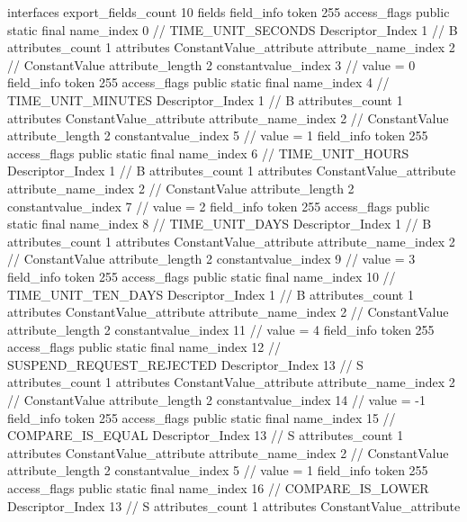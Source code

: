 {{{			interfaces {
			}
			export_fields_count	10
			fields {
			field_info {
				token	255
				access_flags	public static final
				name_index	0		// TIME_UNIT_SECONDS
				Descriptor_Index	1		// B
				attributes_count	1
				attributes {
				ConstantValue_attribute {
					attribute_name_index	2		// ConstantValue
					attribute_length	2
					constantvalue_index	3		// value = 0
				}
				}
			}
			field_info {
				token	255
				access_flags	public static final
				name_index	4		// TIME_UNIT_MINUTES
				Descriptor_Index	1		// B
				attributes_count	1
				attributes {
				ConstantValue_attribute {
					attribute_name_index	2		// ConstantValue
					attribute_length	2
					constantvalue_index	5		// value = 1
				}
				}
			}
			field_info {
				token	255
				access_flags	public static final
				name_index	6		// TIME_UNIT_HOURS
				Descriptor_Index	1		// B
				attributes_count	1
				attributes {
				ConstantValue_attribute {
					attribute_name_index	2		// ConstantValue
					attribute_length	2
					constantvalue_index	7		// value = 2
				}
				}
			}
			field_info {
				token	255
				access_flags	public static final
				name_index	8		// TIME_UNIT_DAYS
				Descriptor_Index	1		// B
				attributes_count	1
				attributes {
				ConstantValue_attribute {
					attribute_name_index	2		// ConstantValue
					attribute_length	2
					constantvalue_index	9		// value = 3
				}
				}
			}
			field_info {
				token	255
				access_flags	public static final
				name_index	10		// TIME_UNIT_TEN_DAYS
				Descriptor_Index	1		// B
				attributes_count	1
				attributes {
				ConstantValue_attribute {
					attribute_name_index	2		// ConstantValue
					attribute_length	2
					constantvalue_index	11		// value = 4
				}
				}
			}
			field_info {
				token	255
				access_flags	public static final
				name_index	12		// SUSPEND_REQUEST_REJECTED
				Descriptor_Index	13		// S
				attributes_count	1
				attributes {
				ConstantValue_attribute {
					attribute_name_index	2		// ConstantValue
					attribute_length	2
					constantvalue_index	14		// value = -1
				}
				}
			}
			field_info {
				token	255
				access_flags	public static final
				name_index	15		// COMPARE_IS_EQUAL
				Descriptor_Index	13		// S
				attributes_count	1
				attributes {
				ConstantValue_attribute {
					attribute_name_index	2		// ConstantValue
					attribute_length	2
					constantvalue_index	5		// value = 1
				}
				}
			}
			field_info {
				token	255
				access_flags	public static final
				name_index	16		// COMPARE_IS_LOWER
				Descriptor_Index	13		// S
				attributes_count	1
				attributes {
				ConstantValue_attribute {
}}}}}}}
